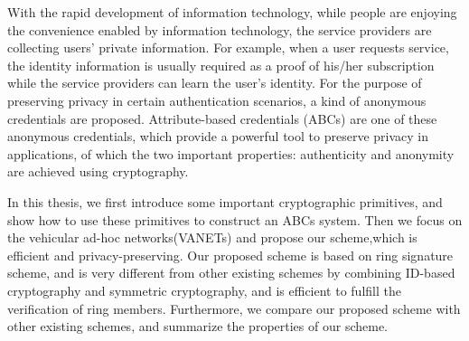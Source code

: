 \begin{eabstract}

With the rapid development of information technology, while people are enjoying the convenience enabled by information technology, the service providers are collecting users' private information.
For example, when a user requests service, the identity information is usually required as a proof of his/her subscription while the service providers can learn the user's identity.
For the purpose of preserving privacy in certain authentication scenarios, a kind of anonymous credentials are proposed.
Attribute-based credentials (ABCs) are one of these anonymous credentials, which provide a powerful tool to preserve privacy in applications, of which the two important properties: authenticity and anonymity are achieved using cryptography.

In this thesis, we first introduce some important cryptographic primitives, and show how to use these primitives to construct an ABCs system. 
Then we focus on the vehicular ad-hoc networks(VANETs) and propose our scheme,which is efficient and privacy-preserving.
Our proposed scheme is based on ring signature scheme, and is very different from other existing schemes by combining ID-based cryptography and symmetric cryptography, and is efficient to fulfill the verification of ring members.
Furthermore, we compare our proposed scheme with other existing schemes, and summarize the properties of our scheme.

\end{eabstract}
